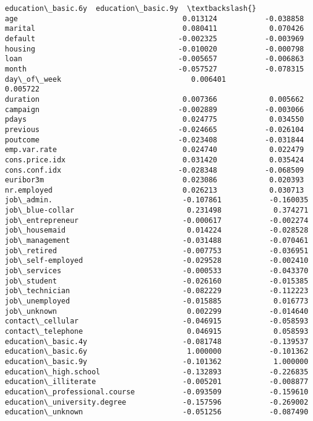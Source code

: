 \documentclass[11pt]{article}
\begin{document}
\begin{tcolorbox}[breakable, size=fbox, boxrule=.5pt, pad at break*=1mm, opacityfill=0]
\begin{Verbatim}[commandchars=\\\{\}]
                               education\_basic.6y  education\_basic.9y  \textbackslash{}
age                                      0.013124           -0.038858
marital                                  0.080411            0.070426
default                                 -0.002325           -0.003969
housing                                 -0.010020           -0.000798
loan                                    -0.005657           -0.006863
month                                   -0.057527           -0.078315
day\_of\_week                              0.006401            0.005722
duration                                 0.007366            0.005662
campaign                                -0.002889           -0.003066
pdays                                    0.024775            0.034550
previous                                -0.024665           -0.026104
poutcome                                -0.023408           -0.031844
emp.var.rate                             0.024740            0.022479
cons.price.idx                           0.031420            0.035424
cons.conf.idx                           -0.028348           -0.068509
euribor3m                                0.023086            0.020393
nr.employed                              0.026213            0.030713
job\_admin.                              -0.107861           -0.160035
job\_blue-collar                          0.231498            0.374271
job\_entrepreneur                        -0.000617           -0.002274
job\_housemaid                            0.014224           -0.028528
job\_management                          -0.031488           -0.070461
job\_retired                             -0.007753           -0.036951
job\_self-employed                       -0.029528           -0.002410
job\_services                            -0.000533           -0.043370
job\_student                             -0.026160           -0.015385
job\_technician                          -0.082229           -0.112223
job\_unemployed                          -0.015885            0.016773
job\_unknown                              0.002299           -0.014640
contact\_cellular                        -0.046915           -0.058593
contact\_telephone                        0.046915            0.058593
education\_basic.4y                      -0.081748           -0.139537
education\_basic.6y                       1.000000           -0.101362
education\_basic.9y                      -0.101362            1.000000
education\_high.school                   -0.132893           -0.226835
education\_illiterate                    -0.005201           -0.008877
education\_professional.course           -0.093509           -0.159610
education\_university.degree             -0.157596           -0.269002
education\_unknown                       -0.051256           -0.087490


\end{Verbatim}
\end{tcolorbox}
\end{document}
